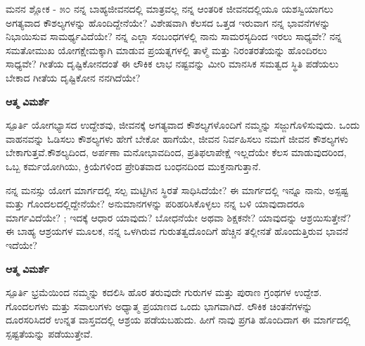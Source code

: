 \newpage
\begin{mananam}{\mananamfont ಮನನ ಶ್ಲೋಕ - ೫೦}
\footnotesize \mananamtext ನನ್ನ ಬಾಹ್ಯಜೀವನದಲ್ಲಿ ಮಾತ್ರವಲ್ಲ ನನ್ನ ಆಂತರಿಕ ಜೀವನದಲ್ಲಿಯೂ ಯಶಸ್ವಿಯಾಗಲು ಅಗತ್ಯವಾದ ಕೌಶಲ್ಯಗಳನ್ನು ಹೊಂದಿದ್ದೇನೆಯೇ? ವಿಶೇಷವಾಗಿ ಕೆಲಸದ ಒತ್ತಡ ಇರುವಾಗ ನನ್ನ ಭಾವನೆಗಳನ್ನು ನಿಭಾಯಿಸುವ ಸಾಮರ್ಥ್ಯವಿದೆಯೇ? ನನ್ನ ಎಲ್ಲಾ ಸಂಬಂಧಗಳಲ್ಲಿ ನಾನು  ಸಾಮರಸ್ಯದಿಂದ ಇರಲು ಸಾಧ್ಯವೇ? ನನ್ನ ಸಮತೋಮುಖ ಯೋಗಕ್ಷೇಮಕ್ಕಾಗಿ ಮಾಡುವ ಪ್ರಯತ್ನಗಳಲ್ಲಿ ತಾಳ್ಮೆ ಮತ್ತು ನಿರಂತರತೆಯನ್ನು ಹೊಂದಿರಲು ಸಾಧ್ಯವೇ? ಗೀತೆಯ ದೃಷ್ಟಿಕೋನದಂತೆ ಈ ಲೌಕಿಕ ಲಾಭ ನಷ್ಟವನ್ನು ಮೀರಿ ಮಾನಸಿಕ ಸಮತ್ವದ ಸ್ಥಿತಿ ಪಡೆಯಲು ಬೇಕಾದ ಗೀತೆಯ ದೃಷ್ಟಿಕೋನ ನನಗಿದೆಯೇ?
\end{mananam}
\WritingHand\enspace\textbf{ಆತ್ಮ ವಿಮರ್ಶೆ}
\begin{inspiration}{\mananamfont ಸ್ಪೂರ್ತಿ}
\footnotesize \mananamtext ಯೋಗಭ್ಯಾಸದ ಉದ್ದೇಶವು, ಜೀವನಕ್ಕೆ ಅಗತ್ಯವಾದ ಕೌಶಲ್ಯಗಳೊಂದಿಗೆ ನಮ್ಮನ್ನು ಸಜ್ಜುಗೊಳಿಸುವುದು. ಒಂದು ವಾಹನವನ್ನು ಓಡಿಸಲು ಕೌಶಲ್ಯಗಳು ಹೇಗೆ ಬೇಕೋ ಹಾಗೆಯೇ, ಜೀವನ ನಿರ್ವಹಿಸಲು ನಮಗೆ ಜೀವನ ಕೌಶಲ್ಯಗಳು ಬೇಕಾಗುತ್ತವೆ.ಕೌಶಲ್ಯದಿಂದ, ಅರ್ಪಣಾ ಮನೋಭಾವದಿಂದ, ಪ್ರತಿಫಲಾಪೇಕ್ಷೆ ಇಲ್ಲದೆಯೇ ಕೆಲಸ ಮಾಡುವುದರಿಂದ, ಒಬ್ಬ ಕರ್ಮಯೋಗಿಯು, ಕ್ರಿಯೆಗಳಿಂದ ಪ್ರೇರಿತವಾದ ಬಂಧನದಿಂದ ಮುಕ್ತನಾಗುತ್ತಾನೆ.
\end{inspiration}
\newpage



\newpage
\begin{mananam}{}
\footnotesize \mananamtext ನನ್ನ ಮನಸ್ಸು ಯೋಗ ಮಾರ್ಗದಲ್ಲಿ ಸಲ್ಪ ಮಟ್ಟಿಗಿನ ಸ್ಥಿರತೆ ಸಾಧಿಸಿದೆಯೇ? ಈ ಮಾರ್ಗದಲ್ಲಿ ಇನ್ನೂ ನಾನು, ಅಸ್ಪಷ್ಟ  ಮತ್ತು ಗೊಂದಲದಲ್ಲಿದ್ದೇನೆಯೇ? ಅನುಮಾನಗಳನ್ನು ಪರಿಹರಿಸಿಕೊಳ್ಳಲು ನನ್ನ ಬಳಿ ಯಾವುದಾದರೂ ಮಾರ್ಗವಿದೆಯೇ? ; ಇದಕ್ಕೆ ಆಧಾರ ಯಾವುದು? ಬೋಧನೆಯೇ ಅಥವಾ ಶಿಕ್ಷಕನೇ? ಯಾವುದನ್ನು ಆಶ್ರಯಿಸುತ್ತೇನೆ? ಈ ಬಾಹ್ಯ ಆಶ್ರಯಗಳ ಮೂಲಕ, ನನ್ನ ಒಳಗಿರುವ ಗುರುತತ್ವದೊಂದಿಗೆ ಹೆಚ್ಚಿನ ತಲ್ಲೀನತೆ ಹೊಂದುತ್ತಿರುವ ಭಾವನೆ ಇದೆಯೇ?
\end{mananam}
\WritingHand\enspace\textbf{ಆತ್ಮ ವಿಮರ್ಶೆ}
\begin{inspiration}{\mananamfont ಸ್ಪೂರ್ತಿ}
\footnotesize \mananamtext ಭ್ರಮೆಯಿಂದ ನಮ್ಮನ್ನು ಕದಲಿಸಿ ಹೊರ ತರುವುದೇ ಗುರುಗಳ ಮತ್ತು ಪುರಾಣ ಗ್ರಂಥಗಳ ಉದ್ದೇಶ. ಗೊಂದಲಗಳು ಮತ್ತು ಸವಾಲುಗಳು ಅಧ್ಯಾತ್ಮ ಪ್ರಯಾಣದ ಒಂದು ಭಾಗವಾಗಿದೆ. ಲೌಕಿಕ ಚಿಂತನೆಗಳನ್ನು ದೂರಸರಿಸಿದರೆ ಉನ್ನತ ವಾಸ್ತವದಲ್ಲಿ ಆಶ್ರಯ ಪಡೆಯಬಹುದು. ಹೀಗೆ ನಾವು ಪ್ರಗತಿ ಹೊಂದಿದಾಗ ಈ ಮಾರ್ಗದಲ್ಲಿ ಸ್ಪಷ್ಟತೆಯನ್ನು ಪಡೆಯುತ್ತೇವೆ.
\end{inspiration}
\newpage


